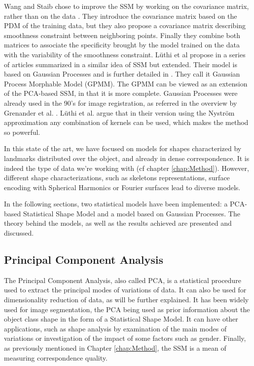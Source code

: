 Wang and Staib chose to improve the SSM by working on the covariance matrix, rather than on the data \cite{wang_2000_boundary}. They introduce the covariance matrix based on the PDM of the training data, but they also propose a covariance matrix describing smoothness constraint between neighboring points. Finally they combine both matrices to associate the specificity brought by the model trained on the data with the variability of the smoothness constraint. 
Lüthi et al propose in a series of articles summarized in \cite{luthi_2017_gaussian} a similar idea of SSM but extended. Their model is based on Gaussian Processes and is further detailed in . They call it Gaussian Process Morphable Model (GPMM). The GPMM can be viewed as an extension of the PCA-based SSM, in that it is more complete. Gaussian Processes were already used in the 90's for image registration, as referred in the overview by Grenander et al. \cite{grenander_1998_computational}. Lüthi et al. argue that in their version using the Nyström approximation any combination of kernels can be used, which makes the method so powerful.  

In this state of the art, we have focused on models for shapes characterized by landmarks distributed over the object, and already in dense correspondence. It is indeed the type of data we're working with (cf chapter \ref{chap:Method}). However, different shape characterizations, such as skeletons representations, surface encoding with Spherical Harmonics or Fourier surfaces lead to diverse models. 

In the following sections, two statistical models have been implemented: a PCA-based Statistical Shape Model and a model based on Gaussian Processes. The theory behind the models, as well as the results achieved are presented and discussed. 

\subsection{Principal Component Analysis}
\label{subsec:4_PCA}

The Principal Component Analysis, also called PCA, is a statistical procedure used to extract the principal modes of variations of data. It can also be used for dimensionality reduction of data, as will be further explained. It has been widely used for image segmentation, the PCA being used as prior information about the object class shape in the form of a Statistical Shape Model. It can have other applications, such as shape analysis by examination of the main modes of variations or investigation of the impact of some factors such as gender. Finally, as previously mentioned in Chapter \ref{chap:Method}, the SSM is a mean of measuring correspondence quality. 

